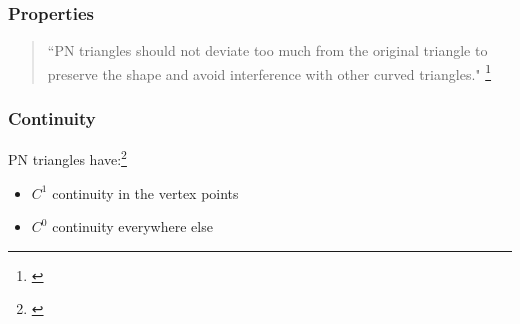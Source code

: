 
\begin{frame}\frametitle{Properties}
	\begin{quote}
		``PN triangles should not deviate too much from the original triangle to preserve the shape and avoid interference with other curved triangles."
		\footnote{\citeauthor{vlachos2001curved}}
	\end{quote}
\end{frame}

\begin{frame}\frametitle{Continuity}	
	PN triangles have:\footnote{\citeauthor{jiao2005parallel}}
	\begin{itemize}
		\item $C^1$ continuity in the vertex points
		\item $C^0$ continuity everywhere else
	\end{itemize}
\end{frame}

